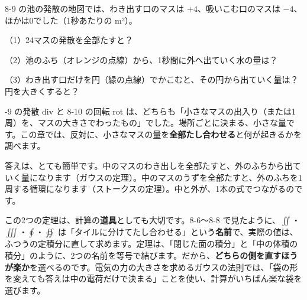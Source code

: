 \begin{hatena}
\noindent\begin{minipage}[c]{0.6\linewidth}\raggedright
8-9 の池の発散の地図では、わき出す口のマスは $+4$、吸いこむ口のマスは $-4$、ほかは0でした（1秒あたりの m²）。\par\vspace{3pt}
（1）24マスの発散を全部たすと？\par
（2）池のふち（オレンジの点線）から、1秒間に外へ出ていく水の量は？\par
（3）わき出す口だけを円（緑の点線）でかこむと、その円から出ていく量は？ 円を大きくすると？
\end{minipage}\hfill
\begin{minipage}[c]{0.37\linewidth}\centering
{}
\end{minipage}
\end{hatena}

-9 の発散 div と 8-10 の回転 rot は、どちらも「小さなマスの出入り（または1周）を、マスの大きさでわったもの」でした。場所ごとに決まる、小さな量です。この章では、反対に、小さなマスの量を\textbf{全部たし合わせる}と何が起きるかを調べます。

答えは、とても簡単です。中のマスのわき出しを全部たすと、外のふちから出ていく量になります（ガウスの定理）。中のマスのうずを全部たすと、外のふちを1周する循環になります（ストークスの定理）。中と外が、1本の式でつながるのです。

この2つの定理は、計算の\textbf{道具}としても大切です。8-6〜8-8 で見たように、$\iint$・$\iiint$・$\oint$・$\oiint$ は「タイルに分けてたし合わせる」という\textbf{名前}で、実際の値は、ふつうの定積分に直して求めます。定理は、「閉じた面の積分」と「中の体積の積分」のように、2つの名前を等号で結びます。だから、\textbf{どちらの側を直すほうが楽か}を選べるのです。電気の力の大きさを求めるガウスの法則では、「袋の形を変えても答えは中の電荷だけで決まる」ことを使い、計算がいちばん楽な袋を選びます。

